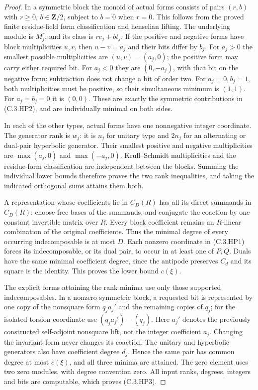 \begin{proof}
In a symmetric block the monoid of actual forms consists
of pairs $(r,b)$ with $r\geq0$, $b\in\mathbf Z/2$, subject
to $b=0$ when $r=0$.  This follows from the proved finite
residue-field form classification and henselian lifting.
The underlying module is $M_j^r$, and its class is
$r e_j+b t_j$.  If the positive and negative forms have
block multiplicities $u,v$, then $u-v=a_j$ and their
bits differ by $b_j$.
For $a_j>0$ the smallest possible multiplicities are
$(u,v)=(a_j,0)$; the positive form may carry either
required bit.  For $a_j<0$ they are $(0,-a_j)$, with
that bit on the negative form; subtraction does not
change a bit of order two.  For $a_j=0,b_j=1$, both
multiplicities must be positive, so their simultaneous
minimum is $(1,1)$.  For $a_j=b_j=0$ it is $(0,0)$.
These are exactly the symmetric contributions in
(C.3.HP2), and are individually minimal on both sides.

In each of the other types, actual forms have one
nonnegative integer coordinate.  The generator rank
is $w_j$: it is $n_j$ for unitary type and $2n_j$
for an alternating or dual-pair hyperbolic generator.
Their smallest positive and negative multiplicities
are $\max(a_j,0)$ and $\max(-a_j,0)$.
Krull--Schmidt multiplicities and the residue-form
classification are independent between the blocks.
Summing the individual lower bounds therefore proves
the two rank inequalities, and taking the indicated
orthogonal sums attains them both.

A representation whose coefficients lie in $C_D(R)$
has all its direct summands in $C_D(R)$: choose free
bases of the summands, and conjugate the coaction by
one constant invertible matrix over $R$.
Every block coefficient remains an $R$-linear
combination of the original coefficients.
Thus the minimal degree of every occurring
indecomposable is at most $D$.
Each nonzero coordinate in (C.3.HP1) forces its
indecomposable, or its dual pair, to occur in at
least one of $P,Q$.  Duals have the same minimal
coefficient degree, since the antipode preserves
$C_d$ and its square is the identity.
This proves the lower bound $c(\xi)$.

The explicit forms attaining the rank minima use
only those supported indecomposables.  In a nonzero
symmetric block, a requested bit is represented by
one copy of the nonsquare form $q_j a_j'$ and the
remaining copies of $q_j$; for the isolated torsion
coordinate use $(q_j a_j')-(q_j)$.
Here $a_j'$ denotes the previously constructed
self-adjoint nonsquare lift, not the integer
coefficient $a_j$.
Changing the invariant form never changes its
coaction.  The unitary and hyperbolic generators
also have coefficient degree $d_j$.
Hence the same pair has common degree at most
$c(\xi)$, and all three minima are attained.
The zero element uses two zero modules, with degree
convention zero.  All input ranks, degrees, integers
and bits are computable, which proves (C.3.HP3).
\end{proof}


